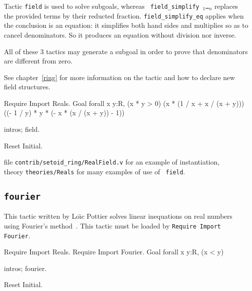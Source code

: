 Tactic {\tt field} is used to solve subgoals, whereas {\tt
  field\_simplify \term$_1$\dots\term$_n$} replaces the provided terms
by their reducted fraction. {\tt field\_simplify\_eq} applies when the
conclusion is an equation: it simplifies both hand sides and multiplies
so as to cancel denominators. So it produces an equation without
division nor inverse.

All of these 3 tactics may generate a subgoal in order to prove that
denominators are different from zero.

See chapter~\ref{ring} for more information on the tactic and how to
declare new field structures.

\Example
\begin{coq_example*}
Require Import Reals.
Goal forall x y:R,
    (x * y > 0)%
    (x * (1 / x + x / (x + y)))%
    ((- 1 / y) * y * (- x * (x / (x + y)) - 1))%
\end{coq_example*}

\begin{coq_example}
intros; field.
\end{coq_example}

\begin{coq_eval}
Reset Initial.
\end{coq_eval}

\SeeAlso file {\tt contrib/setoid\_ring/RealField.v} for an example of instantiation,\\
\phantom{\SeeAlso}theory {\tt theories/Reals} for many examples of use of {\tt
field}.

\subsection{\tt fourier
}

This tactic written by Lo{\"\i}c Pottier solves linear inequations on
real numbers using Fourier's method~\cite{Fourier}. This tactic must
be loaded by {\tt Require Import Fourier}.

\Example
\begin{coq_example*}
Require Import Reals.
Require Import Fourier.
Goal forall x y:R, (x < y)%
\end{coq_example*}

\begin{coq_example}
intros; fourier.
\end{coq_example}

\begin{coq_eval}
Reset Initial.
\end{coq_eval}

